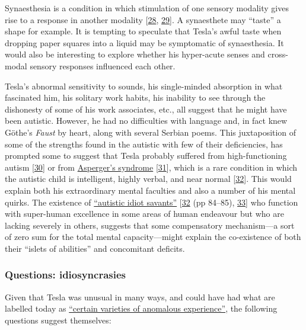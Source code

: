 \documentclass[
  a4paper,
]{article}
\begin{document}
Synaesthesia is a condition in which stimulation of one sensory modality
gives rise to a response in another modality
{[}\protect\hyperlink{ref-marks00}{28},
\protect\hyperlink{ref-cytowic96}{29}{]}. A synaesthete may ``taste'' a
shape for example. It is tempting to speculate that Tesla's awful taste
when dropping paper squares into a liquid may be symptomatic of
synaesthesia. It would also be interesting to explore whether his
hyper-acute senses and cross-modal sensory responses influenced each
other.

Tesla's abnormal sensitivity to sounds, his single-minded absorption in
what fascinated him, his solitary work habits, his inability to see
through the dishonesty of some of his work associates, etc., all suggest
that he might have been autistic. However, he had no difficulties with
language and, in fact knew Göthe's \emph{Faust} by heart, along with
several Serbian poems. This juxtaposition of some of the strengths found
in the autistic with few of their deficiencies, has prompted some to
suggest that Tesla probably suffered from high-functioning autism
{[}\protect\hyperlink{ref-blume04}{30}{]} or from
\href{https://en.wikipedia.org/wiki/Asperger_syndrome}{Asperger's
syndrome} {[}\protect\hyperlink{ref-tesla-faq}{31}{]}, which is a rare
condition in which the autistic child is intelligent, highly verbal, and
near normal {[}\protect\hyperlink{ref-frith90}{32}{]}. This would
explain both his extraordinary mental faculties and also a number of his
mental quirks. The existence of
\href{https://en.wikipedia.org/wiki/Savant_syndrome}{``autistic idiot
savants''} {[}\protect\hyperlink{ref-frith90}{32} (pp 84--85),
\protect\hyperlink{ref-savant2009}{33}{]} who function with super-human
excellence in some areas of human endeavour but who are lacking severely
in others, suggests that some compensatory mechanism---a sort of zero
sum for the total mental capacity---might explain the co-existence of
both their ``islets of abilities'' and concomitant deficits.

\hypertarget{questions-idiosyncrasies}{%
\subsubsection{Questions:
idiosyncrasies}\label{questions-idiosyncrasies}}

Given that Tesla was unusual in many ways, and could have had what are
labelled today as
\href{https://en.wikipedia.org/wiki/Varieties_of_Anomalous_Experience}{``certain
varieties of anomalous experience''}, the following questions suggest
themselves:
\end{document}
